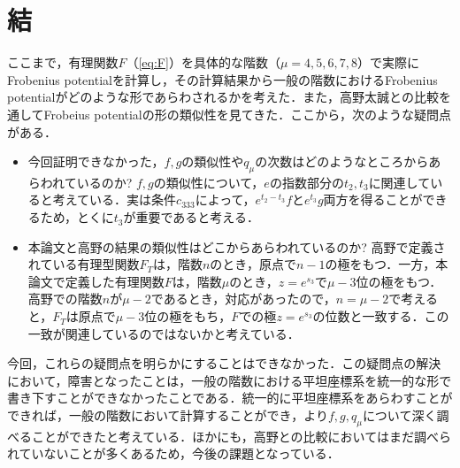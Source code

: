 \documentclass[a4paper,11pt]{jbook}
\theoremstyle{plain}
\theoremstyle{definition}
\theoremstyle{remark}
\theoremstyle{proof}
\numberwithin{equation}{section}
\begin{document}

\chapter*{結}

ここまで，有理関数$F$（\ref{eq:F}）を具体的な階数（$\mu=4,5,6,7,8$）で実際にFrobenius potentialを計算し，その計算結果から一般の階数におけるFrobenius potentialがどのような形であらわされるかを考えた．また，高野太誠\cite{takano}との比較を通してFrobeius potentialの形の類似性を見てきた．ここから，次のような疑問点がある．

\begin{itemize}
\item 今回証明できなかった，$f, g$の類似性や$q_\mu$の次数はどのようなところからあらわれているのか? $f, g$の類似性について，$e$の指数部分の$t_2, t_3$に関連していると考えている．実は条件$c_{333}$によって，$e^{t_2-t_3}f$と$e^{t_3}g$両方を得ることができるため，とくに$t_3$が重要であると考える．

\item 本論文と高野\cite{takano}の結果の類似性はどこからあらわれているのか? 高野\cite[2.1.1]{takano}で定義されている有理型関数$F_T$は，階数$n$のとき，原点で$n-1$の極をもつ．一方，本論文で定義した有理関数$F$は，階数$\mu$のとき，$z=e^{s_3}$で$\mu-3$位の極をもつ．高野での階数$n$が$\mu-2$であるとき，対応があったので，$n=\mu-2$で考えると，$F_T$は原点で$\mu-3$位の極をもち，$F$での極$z=e^{s_3}$の位数と一致する．この一致が関連しているのではないかと考えている．
\end{itemize}

	今回，これらの疑問点を明らかにすることはできなかった．この疑問点の解決において，障害となったことは，一般の階数における平坦座標系を統一的な形で書き下すことができなかったことである．統一的に平坦座標系をあらわすことができれば，一般の階数において計算することができ，より$f, g, q_\mu$について深く調べることができたと考えている．ほかにも，高野\cite{takano}との比較においてはまだ調べられていないことが多くあるため，今後の課題となっている．


\end{document}
